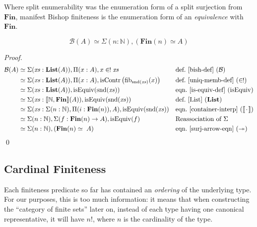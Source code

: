 Where split enumerability was the enumeration form of a split surjection from
\(\mathbf{Fin}\), manifest Bishop finiteness is the enumeration form of an
\emph{equivalence} with \(\mathbf{Fin}\).
\begin{romlemma} \label{bishop-equiv}
  \begin{equation}
    \mathcal{B}(A) \simeq \Sigma {(n : \mathbb{N})} , \left( \mathbf{Fin}(n) \simeq A \right)
  \end{equation}
\end{romlemma}
\begin{proof}
  \begin{align*}
    \mathcal{B}(A)
    & \simeq \Sigma (\mathit{xs} : \textbf{List}(A)) , \Pi {(x : A)} , x \inunique \mathit{xs}
    && \text{def.~\ref{bish-def} } (\mathcal{B})
    \\
    & \simeq \Sigma (\mathit{xs} : \textbf{List}(A)) , \Pi {(x : A)} , \text{isContr} \left(\text{fib}_{\text{snd}(\mathit{xs})}(x)\right)
    && \text{def.~\ref{uniq-memb-def} } (\inunique)
    \\
    & \simeq \Sigma (\mathit{xs} : \textbf{List}(A)) , \text{isEquiv}(\text{snd}(\mathit{xs}))
    && \text{eqn.~\ref{is-equiv-def} (isEquiv)}
    \\
    & \simeq \Sigma (\mathit{xs} : \llbracket \mathbb{N} , \mathbf{Fin} \rrbracket (A)) , \text{isEquiv}(\text{snd}(\mathit{xs}))
    && \text{def.~\ref{List} } (\mathbf{List})
    \\
    & \simeq \Sigma (\mathit{xs} : \Sigma (n : \mathbb{N}) , \Pi (i : \mathbf{Fin}(n)) , A) , \text{isEquiv}(\text{snd}(\mathit{xs}))
    && \text{eqn.~\ref{container-interp} } (\llbracket \wc \rrbracket)
    \\
    & \simeq \Sigma (n : \mathbb{N}) , \Sigma (f : \mathbf{Fin}(n) \rightarrow A) , \text{isEquiv}(f)
    && \text{Reassociation of } \Sigma
    \\
    & \simeq \Sigma (n : \mathbb{N}) , ( \mathbf{Fin}(n) \simeq \; A )
    && \text{eqn.~\ref{surj-arrow-eqn} } (\twoheadrightarrow)
  \end{align*}
  \qed
\end{proof}
\subsection{Cardinal Finiteness}
Each finiteness predicate so far has contained an \emph{ordering} of the
underlying type.
For our purposes, this is too much information: it means that when constructing
the ``category of finite sets'' later on, instead of each type having one
canonical representative, it will have \(n!\), where \(n\) is the cardinality of
the type\footnotemark.

